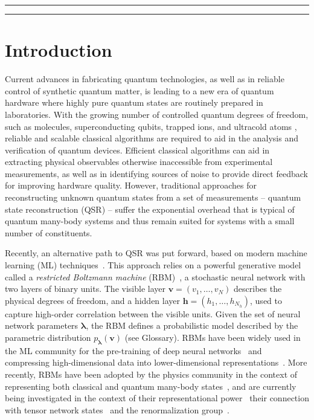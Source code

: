 \documentclass[submission, Phys, hidelnks]{SciPost}
\begin{document}
\vspace{10pt}
\noindent\rule{\textwidth}{1pt}
\tableofcontents\thispagestyle{fancy}
\noindent\rule{\textwidth}{1pt}
\vspace{10pt}

\section{Introduction}
Current advances in fabricating quantum technologies, as well as in reliable control of synthetic quantum matter, is leading to a new era of quantum 
hardware where highly pure quantum states are routinely prepared in laboratories. 
With the growing number of controlled quantum degrees of freedom, such as molecules, superconducting qubits, trapped ions, and ultracold atoms \cite{gambetta17,gambetta18,Bernien17}, reliable and scalable classical algorithms are required to aid in the analysis and verification of quantum devices. 
Efficient classical algorithms can aid in extracting physical observables otherwise inaccessible from experimental measurements, as well as in identifying 
sources of noise to provide direct feedback for improving hardware quality. However, traditional approaches for reconstructing unknown quantum states from a set of measurements -- quantum state reconstruction (QSR) -- suffer the exponential overhead that is typical of quantum many-body systems and thus remain suited for systems with a small number of constituents. 

Recently, an alternative path to QSR was put forward, based on modern machine learning (ML) techniques~\cite{torlai2018tomography, TorlaiMixed}. This approach relies on a powerful generative model called a {\it restricted Boltzmann machine} (RBM)~\cite{Smolensky}, a stochastic neural network with two layers of binary units. The visible layer $\bm{v}=(v_1,\dots,v_N)$ describes the physical degrees of freedom, and a hidden layer $\bm{h}=(h_1,\dots,h_{N_h})$, used to capture high-order correlation between the visible units. Given the set of neural network parameters $\bm{\lambda}$, the RBM defines a probabilistic model described by the parametric distribution $p_{\bm{\lambda}}(\bm{v})$ (see Glossary). RBMs have been widely used in the ML community for the pre-training of deep neural networks~\cite{Hinton06} and compressing high-dimensional data into lower-dimensional representations~\cite{Hinton504}. More recently, RBMs have been adopted by the physics community in the context of representing both classical and quantum many-body states~\cite{Torlai2016thermo, CarleoTroyer2017Science}, and are currently being investigated in the context of their representational power~\cite{Gao} their connection with tensor network states~\cite{GlasserCirac2018} and the renormalization group~\cite{Maciej}.
\end{document}
